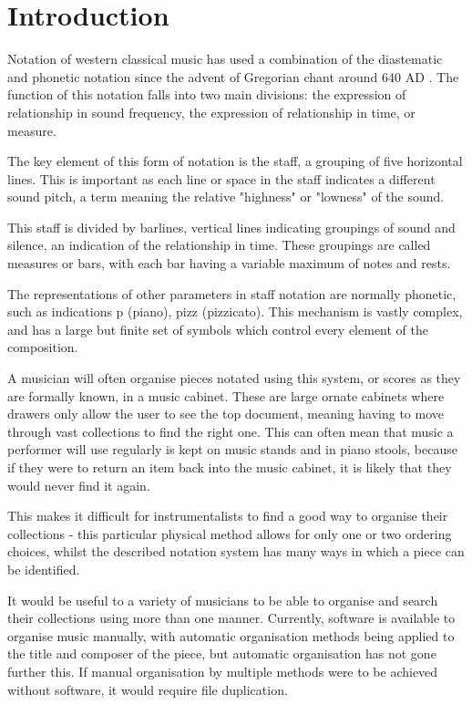 \section{Introduction}
Notation of western classical music has used a combination of the diastematic and phonetic notation \parencite{RRastall} since the advent of Gregorian chant around 640 AD \parencite{RTaruskin}. The function of this notation falls into two main divisions: the expression of relationship in sound frequency, the expression of relationship in time, or measure. \parencite{oxHistory}

The key element of this form of notation is the staff, a grouping of five horizontal lines. This is important as each line or space in the staff indicates a different sound pitch, a term meaning the relative "highness" or "lowness" of the sound. \parencite{classroom} 

This staff is divided by barlines, vertical lines indicating groupings of sound and silence, an indication of the relationship in time. These groupings are called measures or bars, with each bar having a variable maximum of notes and rests. 

The representations of other parameters in staff notation are normally phonetic, such as indications p (piano), pizz (pizzicato). \parencite{RRastall} This mechanism is vastly complex, and has a large but finite set of symbols which control every element of the composition.

A musician will often organise pieces notated using this system, or scores as they are formally known, in a music cabinet. These are large ornate cabinets where drawers only allow the user to see the top document, meaning having to move through vast collections to find the right one. This can often mean that music a performer will use regularly is kept on music stands and in piano stools, because if they were to return an item back into the music cabinet, it is likely that they would never find it again.\parencite{SheetMusicRant}

This makes it difficult for instrumentalists to find a good way to organise their collections - this particular physical method allows for only one or two ordering choices, whilst the described notation system has many ways in which a piece can be identified. 

It would be useful to a variety of musicians to be able to organise and search their collections using more than one manner. Currently, software is available to organise music manually, with automatic organisation methods being applied to the title and composer of the piece\parencite{calypso}, but automatic organisation has not gone further this. If manual organisation by multiple methods were to be achieved without software, it would require file duplication. 

